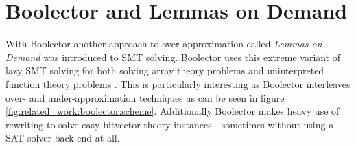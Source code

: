 \section{Boolector and Lemmas on Demand}
\label{par:related_work:boolector}
With Boolector \cite{Brummayer-Biere2009_Chapter_BoolectorAnEfficientSMTSolverF} another  approach to over-approximation called \textit{Lemmas on Demand} was introduced to SMT solving. Boolector uses this extreme variant of lazy SMT solving for both solving array theory problems \cite{p6-brummayer} and uninterpreted function theory problems \cite{NiemetzPreinerBiere-FMCAD14}.
This is particularly interesting as Boolector interleaves over- and under-approximation techniques as can be seen in figure \ref{fig:related_work:boolector:scheme}.
Additionally Boolector makes heavy use of rewriting to solve easy bitvector theory instances - sometimes without using a SAT solver back-end at all.
